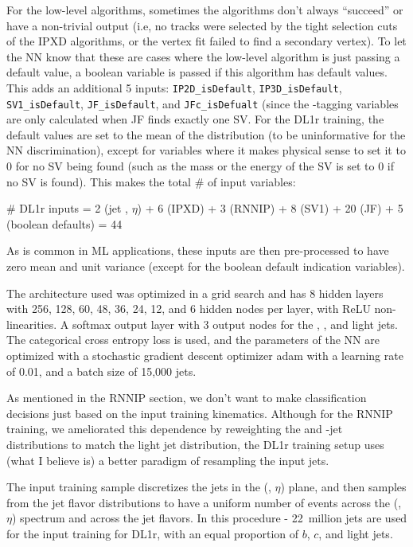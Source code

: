 For the low-level algorithms, sometimes the algorithms don't always ``succeed'' or have a non-trivial output (i.e, no tracks were selected by the tight selection cuts of the IPXD algorithms, or the vertex fit failed to find a secondary vertex). To let the NN know that these are cases where the low-level algorithm is just passing a default value, a boolean variable is passed if this algorithm has default values. This adds an additional 5 inputs: \texttt{IP2D\_isDefault}, \texttt{IP3D\_isDefault}, \texttt{SV1\_isDefault}, \texttt{JF\_isDefault}, and \texttt{JFc\_isDefualt} (since the \Pqc-tagging variables are only calculated when JF finds exactly one SV. 
For the DL1r training, the default values are set to the mean of the distribution (to be uninformative for the NN discrimination), except for variables where it makes physical sense to set it to 0 for no SV being found (such as the mass or the energy of the SV is set to 0 if no SV is found).
This makes the total \# of input variables:

\begin{center}
\# DL1r inputs = 2 \small{(jet \pt, $\eta$)} + 6 (IPXD) + 3 (RNNIP) + 8 (SV1) + 20 (JF) + 5 (boolean defaults) = 44
\end{center}

As is common in ML applications, these inputs are then pre-processed to have zero mean and unit variance (except for the boolean default indication variables).

The architecture used was optimized in a grid search and has 8 hidden layers with 256, 128, 60, 48, 36, 24, 12, and 6 hidden nodes per layer, with ReLU non-linearities. A softmax output layer with 3 output nodes for the \Pqb, \Pqc, and light jets. The categorical cross entropy loss is used, and the parameters of the NN are optimized with a stochastic gradient descent optimizer adam \cite{adam} with a learning rate of 0.01, and a batch size of 15,000 jets.

As mentioned in the RNNIP section, we don't want to make classification decisions just based on the input training kinematics.
Although for the RNNIP training, we ameliorated this dependence by reweighting the \Pqb and \Pqc-jet \pt distributions to match the light jet distribution, the DL1r training setup uses (what I believe is) a better paradigm of resampling the input jets.

The input training sample discretizes the jets in the (\pt, $\eta$) plane, and then samples from the jet flavor distributions to have a uniform number of events across the  (\pt, $\eta$) spectrum and across the jet flavors.
In this procedure - 22~million jets are used for the input training for DL1r, with an equal proportion of $b$, $c$, and light jets.

